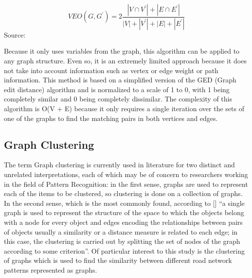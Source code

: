 \begin{equation}
V E O\left(G, G^{\prime}\right)=2 \frac{\left|V \cap V^{\prime}\right|+\left|E \cap E^{\prime}\right|}{|V|+\left|V^{\prime}\right|+|E|+\left|E^{\prime}\right|}
\end{equation}
Source: \cite{Manrique:2018}

Because it only uses variables from the graph, this algorithm can be applied to any graph structure. Even so, it is an extremely limited approach because it does not take into account information such as vertex or edge weight or path information. This method is based on a simplified version of the GED (Graph edit distance) algorithm and is normalized to a scale of 1 to 0, with 1 being completely similar and 0 being completely dissimilar. The complexity of this algorithm is O(V + E) because it only requires a single iteration over the sets of one of the graphs to find the matching pairs in both vertices and edges.


\subsection{Graph Clustering}
The term Graph clustering is currently used in literature for two distinct and unrelated interpretations, each of which may be of concern to researchers working in the field of Pattern Recognition: in the first sense, graphs are used to represent each of the items to be clustered, so clustering is done on a collection of graphs. In the second sense, which is the most commonly found, according to [\cite{Foggia:2014}] “a single graph is used to represent the structure of the space to which the objects belong with a node for every object and edges encoding the relationships between pairs of objects usually a similarity or a distance measure is related to each edge; in this case, the clustering is carried out by splitting the set of nodes of the graph according to some criterion”. Of particular interest to this study is the clustering of graphs which is used to find the similarity between different road network patterns represented as graphs.

